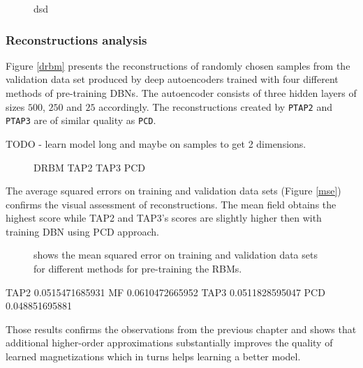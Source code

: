 \documentclass[../report/report.tex]{subfiles}
\begin{document}
\begin{figure}[!h]
\begin{center}
  \label{fig:neuralnet}
  \caption[1]{dsd}
\end{center}
\end{figure}

\subsubsection{Reconstructions analysis}
Figure \ref{drbm} presents the reconstructions of randomly chosen samples from the validation data set produced by deep autoencoders trained with four different methods of pre-training DBNs. The autoencoder consists of three hidden layers of sizes $500$, $250$ and $25$ accordingly. The reconstructions created by \verb|PTAP2| and \verb|PTAP3| are of similar quality as \verb|PCD|. 


TODO - learn model long and maybe on samples to get 2 dimensions.
\begin{figure}[!htb]
\label{fig:drbm}
  \caption[1]{DRBM TAP2 TAP3 PCD}
\end{figure}

The average squared errors on training and validation data sets (Figure \ref{mse}) confirms the visual assessment of reconstructions. The mean field obtains the highest score while TAP2 and TAP3's scores are slightly higher then with training DBN using PCD approach. 

\begin{figure}[!htb]
\label{fig:mse}
  \caption[1]{shows the mean squared error on training and validation data sets for different methods for pre-training the RBMs.}
\end{figure}

TAP2 0.0515471685931
MF 0.0610472665952
TAP3 0.0511828595047
PCD 0.048851695881

Those results confirms the observations from the previous chapter and shows that additional higher-order approximations substantially improves the quality of learned magnetizations which in turns helps learning a better model.
\end{document}
